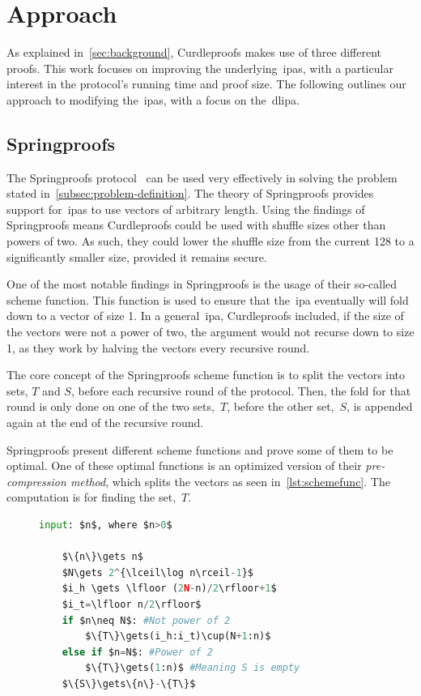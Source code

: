 \section{Approach}\label{sec:approach}
As explained in~\autoref{sec:background}, Curdleproofs makes use of three different proofs.
This work focuses on improving the underlying~\glspl{ipa}, with a particular interest in the protocol's running time and proof size.
The following outlines our approach to modifying the~\glspl{ipa}, with a focus on the~\gls{dlipa}.

\subsection{Springproofs}\label{sec:approach-springproofs}
The Springproofs protocol~\cite{zhang2024springproofs} can be used very effectively in solving the problem stated in~\autoref{subsec:problem-definition}.
The theory of Springproofs provides support for~\glspl{ipa} to use vectors of arbitrary length.
Using the findings of Springproofs means Curdleproofs could be used with shuffle sizes other than powers of two.
As such, they could lower the shuffle size from the current 128 to a significantly smaller size, provided it remains secure.

One of the most notable findings in Springproofs is the usage of their so-called scheme function.
This function is used to ensure that the~\gls{ipa} eventually will fold down to a vector of size 1.
In a general~\gls{ipa}, Curdleproofs included, if the size of the vectors were not a power of two, the argument would not recurse down to size 1, as they work by halving the vectors every recursive round.


The core concept of the Springproofs scheme function is to split the vectors into sets, $T$ and $S$, before each recursive round of the protocol.
Then, the fold for that round is only done on one of the two sets,~$T$, before the other set,~$S$, is appended again at the end of the recursive round.

Springproofs present different scheme functions and prove some of them to be optimal.
One of these optimal functions is an optimized version of their \textit{pre-compression method}, which splits the vectors as seen in~\autoref{lst:schemefunc}.
The computation is for finding the set,~$T$.

\begin{figure}[!htb]
    \begin{lstlisting}[language=Python,mathescape=true,label={lst:schemefunc},numbers=right,caption={Scheme function \textbf{\textit{f}} used in CAAUrdleproofs},captionpos=b,frame=single]
    input: $n$, where $n>0$

    $\{n\}\gets n$
    $N\gets 2^{\lceil\log n\rceil-1}$
    $i_h \gets \lfloor (2N-n)/2\rfloor+1$
    $i_t=\lfloor n/2\rfloor$
    if $n\neq N$: #Not power of 2
        $\{T\}\gets(i_h:i_t)\cup(N+1:n)$
    else if $n=N$: #Power of 2
        $\{T\}\gets(1:n)$ #Meaning S is empty
    $\{S\}\gets\{n\}-\{T\}$
    \end{lstlisting}
\label{fig:schemefunc}
\end{figure}

